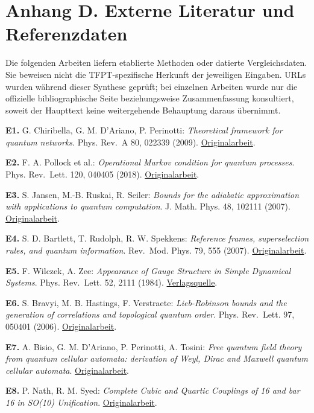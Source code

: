 \section{Anhang D. Externe Literatur und
Referenzdaten}\label{anhang-d.-externe-literatur-und-referenzdaten}

Die folgenden Arbeiten liefern etablierte Methoden oder datierte
Vergleichsdaten. Sie beweisen nicht die TFPT-spezifische Herkunft der
jeweiligen Eingaben. URLs wurden während dieser Synthese geprüft; bei
einzelnen Arbeiten wurde nur die offizielle bibliographische Seite
beziehungsweise Zusammenfassung konsultiert, soweit der Haupttext keine
weitergehende Behauptung daraus übernimmt.

\textbf{E1.} G. Chiribella, G. M. D'Ariano, P. Perinotti:
\emph{Theoretical framework for quantum networks}. Phys. Rev.~A 80,
022339 (2009). \href{https://arxiv.org/abs/0904.4483}{Originalarbeit}.

\textbf{E2.} F. A. Pollock et al.: \emph{Operational Markov condition
for quantum processes}. Phys. Rev.~Lett. 120, 040405 (2018).
\href{https://arxiv.org/abs/1801.09811}{Originalarbeit}.

\textbf{E3.} S. Jansen, M.-B. Ruskai, R. Seiler: \emph{Bounds for the
adiabatic approximation with applications to quantum computation}. J.
Math. Phys. 48, 102111 (2007).
\href{https://arxiv.org/abs/quant-ph/0603175}{Originalarbeit}.

\textbf{E4.} S. D. Bartlett, T. Rudolph, R. W. Spekkens: \emph{Reference
frames, superselection rules, and quantum information}. Rev.~Mod. Phys.
79, 555 (2007).
\href{https://arxiv.org/abs/quant-ph/0610030}{Originalarbeit}.

\textbf{E5.} F. Wilczek, A. Zee: \emph{Appearance of Gauge Structure in
Simple Dynamical Systems}. Phys. Rev.~Lett. 52, 2111 (1984).
\href{https://doi.org/10.1103/PhysRevLett.52.2111}{Verlagsquelle}.

\textbf{E6.} S. Bravyi, M. B. Hastings, F. Verstraete:
\emph{Lieb-Robinson bounds and the generation of correlations and
topological quantum order}. Phys. Rev.~Lett. 97, 050401 (2006).
\href{https://arxiv.org/abs/quant-ph/0603121}{Originalarbeit}.

\textbf{E7.} A. Bisio, G. M. D'Ariano, P. Perinotti, A. Tosini:
\emph{Free quantum field theory from quantum cellular automata:
derivation of Weyl, Dirac and Maxwell quantum cellular automata}.
\href{https://arxiv.org/abs/1601.04832}{Originalarbeit}.

\textbf{E8.} P. Nath, R. M. Syed: \emph{Complete Cubic and Quartic
Couplings of 16 and bar 16 in SO(10) Unification}.
\href{https://arxiv.org/abs/hep-th/0109116}{Originalarbeit}.

